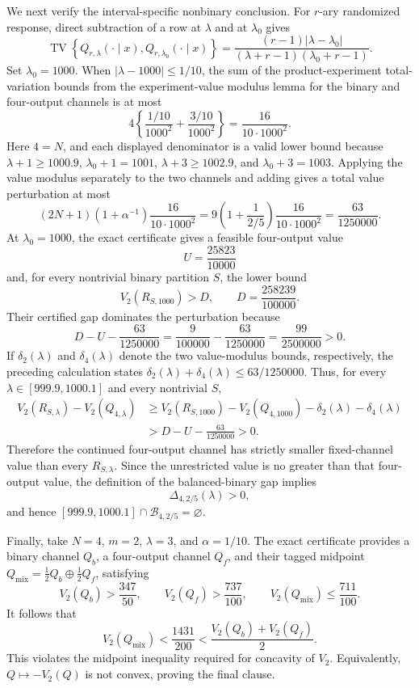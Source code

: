 We next verify the interval-specific nonbinary conclusion. For \(r\)-ary randomized response, direct subtraction of a row at \(\lambda\) and at \(\lambda_0\) gives
\[
 \operatorname{TV}\!\left\{Q_{r,\lambda}(\cdot\mid x),
 Q_{r,\lambda_0}(\cdot\mid x)\right\}
 =\frac{(r-1)|\lambda-\lambda_0|}
 {(\lambda+r-1)(\lambda_0+r-1)}.
\]
Set \(\lambda_0=1000\). When \(|\lambda-1000|\le1/10\), the sum of the product-experiment total-variation bounds from the experiment-value modulus lemma for the binary and four-output channels is at most
\[
 4\left\{
 \frac{1/10}{1000^2}+
 \frac{3/10}{1000^2}
 \right\}
 =\frac{16}{10\cdot1000^2}.
\]
Here \(4=N\), and each displayed denominator is a valid lower bound because \(\lambda+1\ge1000.9\), \(\lambda_0+1=1001\), \(\lambda+3\ge1002.9\), and \(\lambda_0+3=1003\). Applying the value modulus separately to the two channels and adding gives a total value perturbation at most
\[
 (2N+1)(1+\alpha^{-1})\frac{16}{10\cdot1000^2}
 =9\left(1+\frac{1}{2/5}\right)
   \frac{16}{10\cdot1000^2}
 =\frac{63}{1250000}.
\]
At \(\lambda_0=1000\), the exact certificate gives a feasible four-output value
\[
 U=\frac{25823}{10000}
\]
and, for every nontrivial binary partition \(S\), the lower bound
\[
 V_2(R_{S,1000})>D,
 \qquad D=\frac{258239}{100000}.
\]
Their certified gap dominates the perturbation because
\[
 D-U-\frac{63}{1250000}
 =\frac{9}{100000}-\frac{63}{1250000}
 =\frac{99}{2500000}>0.
\]
If \(\delta_2(\lambda)\) and \(\delta_4(\lambda)\) denote the two value-modulus bounds, respectively, the preceding calculation states \(\delta_2(\lambda)+\delta_4(\lambda)\le63/1250000\). Thus, for every \(\lambda\in[999.9,1000.1]\) and every nontrivial \(S\),
\[
\begin{aligned}
 V_2(R_{S,\lambda})-V_2(Q_{4,\lambda})
 &\ge V_2(R_{S,1000})-V_2(Q_{4,1000})
       -\delta_2(\lambda)-\delta_4(\lambda)\\
 &>D-U-\frac{63}{1250000}>0.
\end{aligned}
\]
Therefore the continued four-output channel has strictly smaller fixed-channel value than every \(R_{S,\lambda}\). Since the unrestricted value is no greater than that four-output value, the definition of the balanced-binary gap implies
\[
 \Delta_{4,2/5}(\lambda)>0,
\]
and hence \([999.9,1000.1]\cap\mathcal B_{4,2/5}=\varnothing\).

Finally, take \(N=4\), \(m=2\), \(\lambda=3\), and \(\alpha=1/10\). The exact certificate provides a binary channel \(Q_b\), a four-output channel \(Q_f\), and their tagged midpoint \(Q_{\mathrm{mix}}=\tfrac12Q_b\oplus\tfrac12Q_f\), satisfying
\[
 V_2(Q_b)>\frac{347}{50},
 \qquad
 V_2(Q_f)>\frac{737}{100},
 \qquad
 V_2(Q_{\mathrm{mix}})\le\frac{711}{100}.
\]
It follows that
\[
 V_2(Q_{\mathrm{mix}})
 <\frac{1431}{200}
 <\frac{V_2(Q_b)+V_2(Q_f)}2.
\]
This violates the midpoint inequality required for concavity of \(V_2\). Equivalently, \(Q\mapsto-V_2(Q)\) is not convex, proving the final clause.
